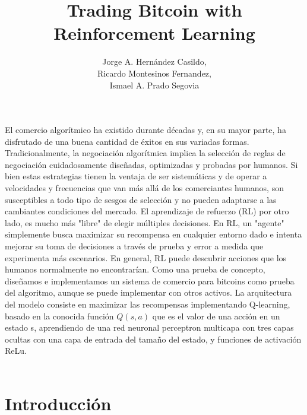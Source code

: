 \documentclass[12pt,letterpaper]{article}
\title{Trading Bitcoin with Reinforcement
Learning}
\author{Jorge A. Hernández Casildo, \\Ricardo Montesinos Fernandez, 
 \\Ismael A. Prado Segovia}
\begin{document}
\maketitle
\abstract El comercio algorítmico ha existido durante décadas y, en su mayor parte, ha disfrutado de una buena
cantidad de éxitos en sus variadas formas. Tradicionalmente, la negociación algorítmica implica la
selección de reglas de negociación cuidadosamente diseñadas, optimizadas y probadas por humanos. Si
bien estas estrategias tienen la ventaja de ser sistemáticas y de operar a velocidades y frecuencias que
van más allá de los comerciantes humanos, son susceptibles a todo tipo de sesgos de selección y no
pueden adaptarse a las cambiantes condiciones del mercado. El aprendizaje de refuerzo (RL) por otro
lado, es mucho más "libre" de elegir múltiples decisiones. En RL, un "agente" simplemente busca maximizar su recompensa
en cualquier entorno dado e intenta mejorar su toma de decisiones a través de prueba y error a medida
que experimenta más escenarios. En general, RL puede descubrir acciones que los humanos normalmente no encontrarían. Como una prueba de
concepto, diseñamos e implementamos un sistema de comercio para bitcoins como prueba del algoritmo, aunque se puede implementar con otros activos.
La arquitectura del modelo consiste en maximizar las recompensas implementando Q-learning, basado en la conocida función $Q(s,a)$ que es el valor de una acción en un estado s, aprendiendo de una red neuronal perceptron multicapa con tres capas ocultas con una capa de entrada del tamaño del estado, y funciones de activación ReLu.
\\
\\
\section{Introducci\'on}
\end{document}
